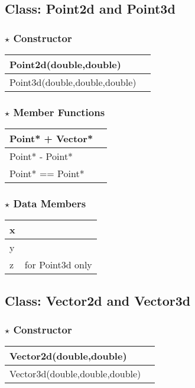 \documentclass[onecolumn,10pt]{article}
\begin{document}
\subsection{Class: Point2d and Point3d}

\subsubsection*{$\star$ Constructor}
\begin{tabular}{l|l}
Point2d(double,double) & \\\hline
Point3d(double,double,double) & \\
\end{tabular}

\subsubsection*{$\star$ Member Functions}

\begin{tabular}{l|l}
Point* +  Vector* & \\\hline
Point* -  Point*  & \\\hline
Point* == Point*  & \\
\end{tabular}

\subsubsection*{$\star$ Data Members}

\begin{tabular}{l|l}
x  & \\\hline
y  & \\\hline
z  & for Point3d only \\
\end{tabular}

\subsection{Class: Vector2d and Vector3d}

\subsubsection*{$\star$ Constructor}
\begin{tabular}{l|l}
Vector2d(double,double) & \\\hline
Vector3d(double,double,double) & \\
\end{tabular}
\end{document}
